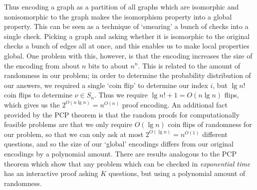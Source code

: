 \documentclass{article}
\theoremstyle{plain}
\theoremstyle{definition}
\begin{document}
Thus encoding a graph as a partition of all graphs which are isomorphic and nonisomorphic to the graph makes the isomorphism property into a global property. This can be seen as a technique of `smearing' a bunch of checks into a single check. Picking a graph and asking whether it is isomorphic to the original checks a bunch of edges all at once, and this enables us to make local properties global. One problem with this, however, is that the encoding increases the size of the encoding from about $n$ bits to about $n^n$. This is related to the amount of randomness in our problem; in order to determine the probability distribution of our answers, we required a single `coin flip' to determine our index $i$, but $\lg n!$ coin flips to determine $\nu \in S_n$. Thus we require $\lg n! + 1 = O(n \lg n)$ flips, which gives us the $2^{O(n \lg n)} = n^{O(n)}$ proof encoding. An additional fact provided by the PCP theorem is that the random proofs for computationally feasible problems are that we only require $O(\lg n)$ coin flips of randomness for our problem, so that we can only ask at most $2^{O(\lg n)} = n^{O(1)}$ different questions, and so the size of our `global' encodings differs from our original encodings by a polynomial amount. There are results analogous to the PCP theorem which show that any problem which can be checked in {\it exponential time} has an interactive proof asking $K$ questions, but using a polynomial amount of randomness.
\end{document}
